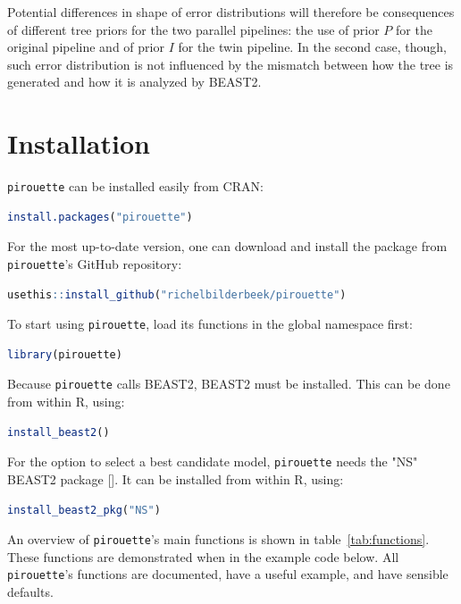 \documentclass{article}
\begin{document}
Potential differences in shape of error distributions will therefore be 
consequences of different tree priors for the two parallel pipelines: the use 
of prior $\mathit{P}$ for the original pipeline and of prior $\mathit{I}$ for 
the twin pipeline. In the second case, though, such error distribution is not 
influenced by the mismatch between how the tree is generated and how it is 
analyzed by BEAST2.
\section{Installation}

\verb;pirouette; can be installed easily from CRAN:
\begin{lstlisting}[language=R, floatplacement=ht, frame=single]
install.packages("pirouette")
\end{lstlisting}

For the most up-to-date version, 
one can download and install the package from \verb;pirouette;'s GitHub 
repository:

\begin{lstlisting}[language=R, floatplacement=ht, frame=single]
usethis::install_github("richelbilderbeek/pirouette")
\end{lstlisting}

To start using \verb;pirouette;, load its functions in the global namespace 
first:

\begin{lstlisting}[language=R, floatplacement=ht, frame=single]
library(pirouette)
\end{lstlisting}
Because \verb;pirouette; calls BEAST2, BEAST2 must be installed. 
This can be done from within R, using:

\begin{lstlisting}[language=R, floatplacement=ht, frame=single]
install_beast2()
\end{lstlisting}
For the option to select a best candidate model,
\verb;pirouette; needs the "NS" BEAST2 package [\cite{maturana2018model}].
It can be installed from within R, using:

\begin{lstlisting}[language=R, floatplacement=ht, frame=single]
install_beast2_pkg("NS")
\end{lstlisting}

An overview of \verb;pirouette;'s main functions is shown in 
table~\ref{tab:functions}. 
These functions are demonstrated when in the example code below.
All \verb;pirouette;'s functions are documented,
have a useful example, and have sensible defaults.
\end{document}
